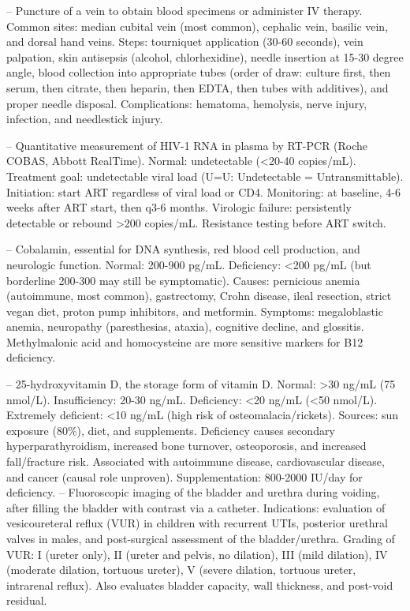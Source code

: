 -- Puncture of a vein to obtain blood specimens or administer IV therapy. Common sites: median cubital vein (most common), cephalic vein, basilic vein, and dorsal hand veins. Steps: tourniquet application (30-60 seconds), vein palpation, skin antisepsis (alcohol, chlorhexidine), needle insertion at 15-30 degree angle, blood collection into appropriate tubes (order of draw: culture first, then serum, then citrate, then heparin, then EDTA, then tubes with additives), and proper needle disposal. Complications: hematoma, hemolysis, nerve injury, infection, and needlestick injury.

-- Quantitative measurement of HIV-1 RNA in plasma by RT-PCR (Roche COBAS, Abbott RealTime). Normal: undetectable (<20-40 copies/mL). Treatment goal: undetectable viral load (U=U: Undetectable = Untransmittable). Initiation: start ART regardless of viral load or CD4. Monitoring: at baseline, 4-6 weeks after ART start, then q3-6 months. Virologic failure: persistently detectable or rebound >200 copies/mL. Resistance testing before ART switch.

-- Cobalamin, essential for DNA synthesis, red blood cell production, and neurologic function. Normal: 200-900 pg/mL. Deficiency: <200 pg/mL (but borderline 200-300 may still be symptomatic). Causes: pernicious anemia (autoimmune, most common), gastrectomy, Crohn disease, ileal resection, strict vegan diet, proton pump inhibitors, and metformin. Symptoms: megaloblastic anemia, neuropathy (paresthesias, ataxia), cognitive decline, and glossitis. Methylmalonic acid and homocysteine are more sensitive markers for B12 deficiency.

-- 25-hydroxyvitamin D, the storage form of vitamin D. Normal: >30 ng/mL (75 nmol/L). Insufficiency: 20-30 ng/mL. Deficiency: <20 ng/mL (<50 nmol/L). Extremely deficient: <10 ng/mL (high risk of osteomalacia/rickets). Sources: sun exposure (80\%), diet, and supplements. Deficiency causes secondary hyperparathyroidism, increased bone turnover, osteoporosis, and increased fall/fracture risk. Associated with autoimmune disease, cardiovascular disease, and cancer (causal role unproven). Supplementation: 800-2000 IU/day for deficiency.
-- Fluoroscopic imaging of the bladder and urethra during voiding, after filling the bladder with contrast via a catheter. Indications: evaluation of vesicoureteral reflux (VUR) in children with recurrent UTIs, posterior urethral valves in males, and post-surgical assessment of the bladder/urethra. Grading of VUR: I (ureter only), II (ureter and pelvis, no dilation), III (mild dilation), IV (moderate dilation, tortuous ureter), V (severe dilation, tortuous ureter, intrarenal reflux). Also evaluates bladder capacity, wall thickness, and post-void residual.

